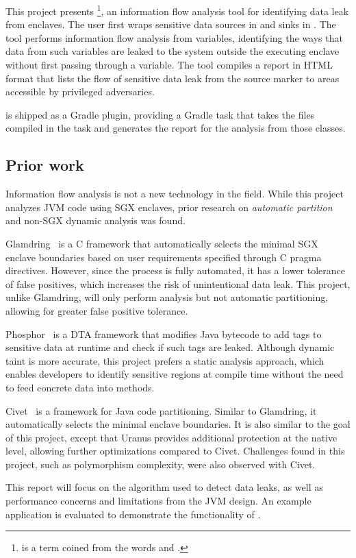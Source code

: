 This project presents \pname{}
\footnote{ is a term coined from the words  and .},
an information flow analysis tool
for identifying data leak from enclaves.
The user first wraps sensitive data sources in  and sinks in .
The tool performs information flow analysis from  variables,
identifying the ways that data from such variables are leaked
to the system outside the executing enclave
without first passing through a  variable.
The tool compiles a report in HTML format
that lists the flow of sensitive data leak
from the source marker to areas accessible by privileged adversaries.

\pname{} is shipped as a Gradle plugin,
providing a Gradle task that
takes the  files compiled in the  task
and generates the report for the analysis from those classes.

\subsection{Prior work}\label{subsec:prior-art}
Information flow analysis is not a new technology in the field.
While this project analyzes \ac{JVM} code using \ac{SGX} enclaves,
prior research on \emph{automatic partition} and non-SGX dynamic analysis was found.

Glamdring~\cite{glamdring} is a C framework that
automatically selects the minimal \ac{SGX} enclave boundaries
based on user requirements specified through C pragma directives.
However, since the process is fully automated,
it has a lower tolerance of false positives,
which increases the risk of unintentional data leak.
This project, unlike Glamdring, will only perform analysis but not automatic partitioning,
allowing for greater false positive tolerance.

Phosphor~\cite{BellJonathan2014Pidd} is a \ac{DTA} framework
that modifies Java bytecode to add tags to sensitive data at runtime
and check if such tags are leaked.
Although dynamic taint is more accurate,
this project prefers a static analysis approach,
which enables developers to identify sensitive regions at compile time
without the need to feed concrete data into methods.

Civet~\cite{civet} is a framework for Java code partitioning.
Similar to Glamdring, it automatically selects the minimal enclave boundaries.
It is also similar to the goal of this project,
except that Uranus provides additional protection at the native level,
allowing further optimizations compared to Civet.
Challenges found in this project, such as polymorphism complexity, were also observed with Civet.

This report will focus on the algorithm used to detect data leaks,
as well as performance concerns and limitations from the \ac{JVM} design.
An example application is evaluated to demonstrate the functionality of \pname{}.
